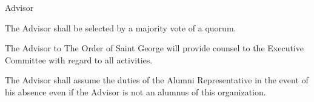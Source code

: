 {
	\begin{article}{Advisor}
		\item The Advisor shall be selected by a majority vote of a quorum.
		\item The Advisor to The Order of Saint George will provide counsel to the Executive Committee with regard to all activities.
		\item The Advisor shall assume the duties of the Alumni Representative in the event of his absence even if the Advisor is not an alumnus of this organization.
	\end{article}
}